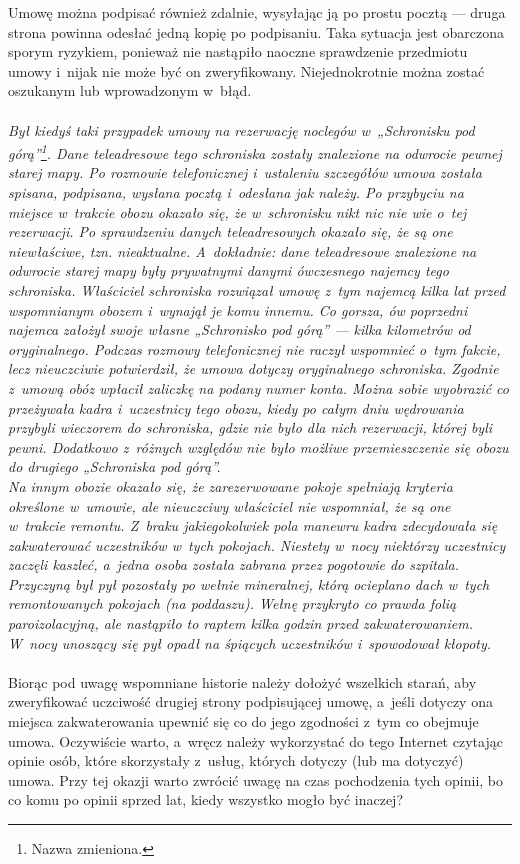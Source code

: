 \documentclass[a5paper,10pt,titlepage,twoside]{article}
\begin{document}
Umowę można podpisać również zdalnie, wysyłając ją po prostu pocztą --- druga strona powinna odesłać jedną kopię po podpisaniu. Taka sytuacja jest obarczona sporym ryzykiem, ponieważ nie nastąpiło naoczne sprawdzenie przedmiotu umowy i~nijak nie może być on zweryfikowany. Niejednokrotnie można zostać oszukanym lub wprowadzonym w~błąd.
\\
\\
\small{
\emph{Był kiedyś taki przypadek umowy na rezerwację noclegów w~„Schronisku pod górą”\footnote{Nazwa zmieniona.}. Dane teleadresowe tego schroniska zostały znalezione na odwrocie pewnej starej mapy. Po rozmowie telefonicznej i~ustaleniu szczegółów umowa została spisana, podpisana, wysłana pocztą i~odesłana jak należy. Po przybyciu na miejsce w~trakcie obozu okazało się, że w~schronisku nikt nic nie wie o~tej rezerwacji. Po sprawdzeniu danych teleadresowych okazało się, że są one niewłaściwe, tzn. nieaktualne. A~dokładnie: dane teleadresowe znalezione na odwrocie starej mapy były prywatnymi danymi ówczesnego najemcy tego schroniska. Właściciel schroniska rozwiązał umowę z~tym najemcą kilka lat przed wspomnianym obozem i~wynajął je komu innemu. Co gorsza, ów poprzedni najemca założył swoje własne „Schronisko pod górą” --- kilka kilometrów od oryginalnego. Podczas rozmowy telefonicznej nie raczył wspomnieć o~tym fakcie, lecz nieuczciwie potwierdził, że umowa dotyczy oryginalnego schroniska. Zgodnie z~umową obóz wpłacił zaliczkę na podany numer konta. Można sobie wyobrazić co przeżywała kadra i~uczestnicy tego obozu, kiedy po całym dniu wędrowania przybyli wieczorem do schroniska, gdzie nie było dla nich rezerwacji, której byli pewni. Dodatkowo z~różnych względów nie było możliwe przemieszczenie się obozu do drugiego „Schroniska pod górą”.}
\\
\emph{Na innym obozie okazało się, że zarezerwowane pokoje spełniają kryteria określone w~umowie, ale nieuczciwy właściciel nie wspomniał, że są one w~trakcie remontu. Z~braku jakiegokolwiek pola manewru kadra zdecydowała się zakwaterować uczestników w~tych pokojach. Niestety w~nocy niektórzy uczestnicy zaczęli kaszleć, a~jedna osoba została zabrana przez pogotowie do szpitala. Przyczyną był pył pozostały po wełnie mineralnej, którą ocieplano dach w~tych remontowanych pokojach (na poddaszu). Wełnę przykryto co prawda folią paroizolacyjną, ale nastąpiło to raptem kilka godzin przed zakwaterowaniem. W~nocy unoszący się pył opadł na śpiących uczestników i~spowodował kłopoty.}
}
\\
\\
Biorąc pod uwagę wspomniane historie należy dołożyć wszelkich starań, aby zweryfikować uczciwość drugiej strony podpisującej umowę, a~jeśli dotyczy ona miejsca zakwaterowania upewnić się co do jego zgodności z~tym co obejmuje umowa. Oczywiście warto, a~wręcz należy wykorzystać do tego Internet czytając opinie osób, które skorzystały z~usług, których dotyczy (lub ma dotyczyć) umowa. Przy tej okazji warto zwrócić uwagę na czas pochodzenia tych opinii, bo co komu po opinii sprzed lat, kiedy wszystko mogło być inaczej?
\end{document}

